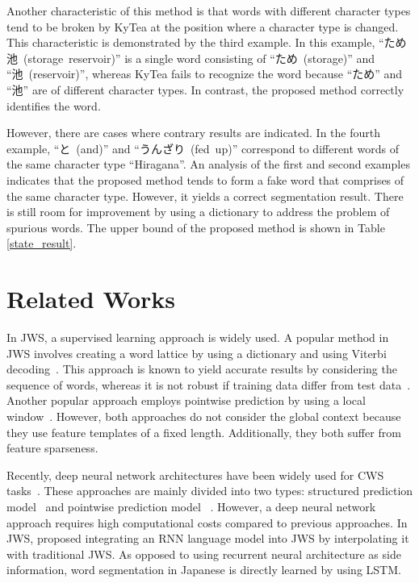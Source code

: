 \documentclass[11pt]{article}
\begin{document}
Another characteristic of this method is that words with different
character types tend to be broken by KyTea at the position where a character
type is changed. This characteristic is demonstrated by the third example. In
this example, \mbox{``ため池 (storage reservoir)''} is a single word
consisting of \mbox{``ため (storage)''} and \mbox{``池 (reservoir)''},
whereas KyTea fails to recognize the word because \mbox{``ため''} and
\mbox{``池''} are of different character types. In contrast, the proposed
method correctly identifies the word.

However, there are cases where contrary results are indicated. In the fourth
example, \mbox{``と (and)''} and \mbox{``うんざり (fed up)''} correspond to
different words of the same character type \mbox{``Hiragana''}. An analysis of
the first and second examples indicates that the proposed method tends to form
a fake word that comprises of the same character type. However, it yields a
correct segmentation result. There is still room for improvement by using a
dictionary to address the problem of spurious words. The upper bound of
the proposed method is shown in Table \ref{state_result}.


\section{Related Works}
\label{sec:relatedworks}
In JWS, a supervised learning approach is widely used. A popular method in JWS
involves creating a word lattice by using a dictionary and using Viterbi
decoding~\cite{kudo-yamamoto-matsumoto:2004:EMNLP,sassano2002empirical}. This
approach is known to yield accurate results by considering the sequence of
words, whereas it is not robust if training data differ from test
data~\cite{neubig-nakata-mori:2011:ACL-HLT2011}.
Another popular approach employs pointwise prediction by using a local
window~\cite{neubig-nakata-mori:2011:ACL-HLT2011,NEUBIG10.408}. However, both
approaches do not consider the global context because they use feature
templates of a fixed length. Additionally, they both suffer from feature
sparseness.

Recently, deep neural network architectures have been widely used for CWS
tasks~\cite{chen-EtAl:2015:EMNLP2,chen-EtAl:2015:ACL-IJCNLP5,pei-ge-chang:2014:P14-1,zhang-zhang-fu:2016:P16-1,cai-zhao:2016:P16-1}.
These approaches are mainly divided into two types: structured prediction
model~\cite{zhang-zhang-fu:2016:P16-1,cai-zhao:2016:P16-1} and pointwise prediction model ~\cite{chen-EtAl:2015:EMNLP2,chen-EtAl:2015:ACL-IJCNLP5,pei-ge-chang:2014:P14-1}. However, a deep neural network approach requires high computational costs compared to previous approaches. 
In JWS,  proposed integrating an
RNN language model into JWS by interpolating it with traditional JWS. As
opposed to using recurrent neural architecture as side information, word
segmentation in Japanese is directly learned by using LSTM.
\end{document}
